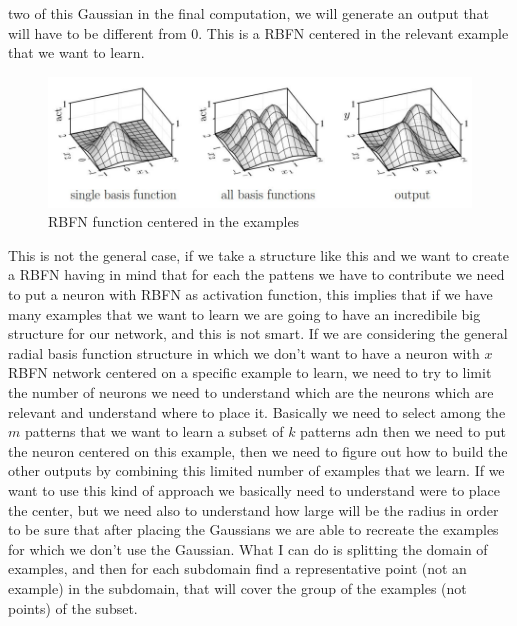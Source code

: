 \documentclass{article}
\begin{document}
two of this Gaussian in the final computation, we will generate an output that will
have to be different from $0$. This is a RBFN centered in the relevant example that
we want to learn.
\begin{figure}
    \centering
    \includegraphics[scale=0.4]{images/rbfn_gauss.png}
    \caption{RBFN function centered in the examples}
\end{figure}
This is not the general case, if we take a structure like this and we want to create
a RBFN having in mind that for each the pattens we have to contribute we need to put a neuron
with RBFN as activation function, this implies that if we have many examples that we want to learn
we are going to have an incredibile big structure for our network, and this is not smart.
\newline\newline
If we are considering the general radial basis function structure in which we don't want to have a neuron with $x$
RBFN network centered on a specific example to learn, we need to try to limit the number of neurons
we need to understand which are the neurons which are relevant and understand where to place it.
Basically we need to select among the $m$ patterns that we want to learn a subset of $k$ patterns
adn then we need to put the neuron centered on this example, then we need to figure out how to build
the other outputs by combining this limited number of examples that we learn.
\newline\newline
If we want to use this kind of approach we basically need to understand were to place the center,
but we need also to understand how large will be the radius in order to be sure that
after placing the Gaussians we are able to recreate the examples for which we don't use the
Gaussian.
\newline\newline
What I can do is splitting the domain of examples, and then for each subdomain find a representative
point (not an example) in the subdomain, that will cover the group of the examples (not points)
of the subset.
\newline\newline
\end{document}
